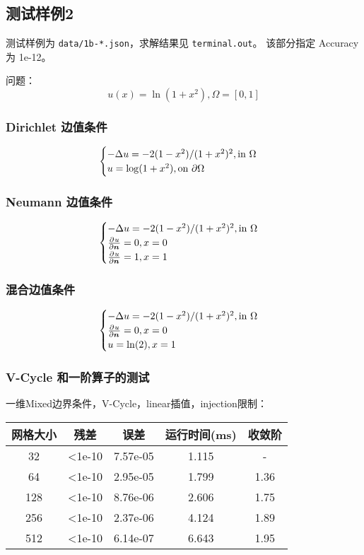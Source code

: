\documentclass[lang=cn,a4paper,newtx,bibend=bibtex]{elegantpaper}
\begin{document}
\subsection{测试样例2}

测试样例为 \texttt{data/1b-*.json}，求解结果见 \texttt{terminal.out}。
该部分指定 Accuracy 为 1e-12。

问题： 
\[
  u(x) = \ln(1 + x^2), \Omega = [0, 1]
\]

\subsubsection{Dirichlet 边值条件}

\[
  \begin{cases} 
  -\Delta u =  -2(1-x^2)/(1+x^2)^2, \text{in} ~\Omega \\
  u = \log(1 + x^2), \text{on}~\partial \Omega
   \end{cases}
\]

\subsubsection{Neumann 边值条件}

\[
  \begin{cases} 
  -\Delta u =  -2(1-x^2)/(1+x^2)^2, \text{in} ~\Omega \\
  \frac{\partial^{}{u}}{\partial {\bm{n}}^{}} = 0, x = 0 \\
  \frac{\partial^{}{u}}{\partial {\bm{n}}^{}} = 1, x = 1
   \end{cases}
\]

\subsubsection{混合边值条件}

\[
  \begin{cases} 
  -\Delta u =  -2(1-x^2)/(1+x^2)^2, \text{in} ~\Omega \\
  \frac{\partial^{}{u}}{\partial {\bm{n}}^{}} = 0, x = 0 \\
  u = \ln(2), x = 1
   \end{cases}
\]

\subsubsection{V-Cycle 和一阶算子的测试}

一维Mixed边界条件，V-Cycle，linear插值，injection限制：

\begin{longtable}{|c|cccc|} \hline
网格大小 & 残差 & 误差 & 运行时间(ms) & 收敛阶 \\ \hline
32 	& <1e-10	& 7.57e-05	& 1.115  & - \\ \hline
64 	& <1e-10	& 2.95e-05	& 1.799  & 1.36 \\ \hline
128	& <1e-10	& 8.76e-06	& 2.606  & 1.75 \\ \hline
256	& <1e-10	& 2.37e-06	& 4.124  & 1.89 \\ \hline
512	& <1e-10	& 6.14e-07	& 6.643  & 1.95 \\ \hline
\end{longtable}
\end{document}
